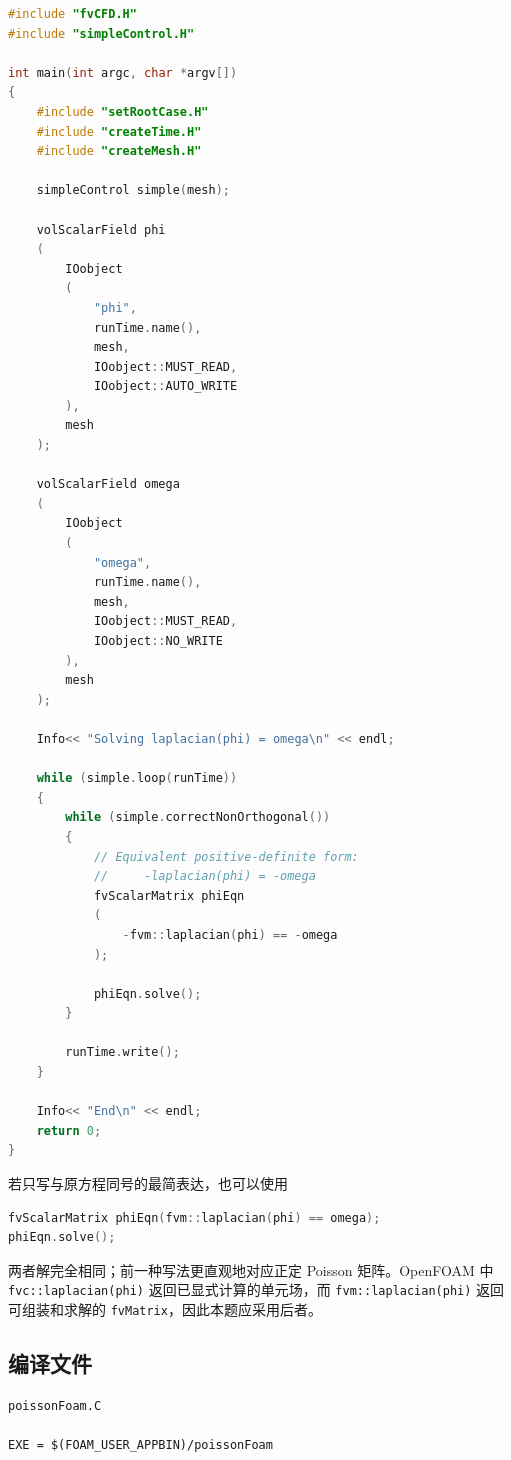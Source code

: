 \documentclass[UTF8,a4paper,11pt]{ctexart}
\begin{document}
\begin{lstlisting}[language=C++,caption={poissonFoam.C}]
#include "fvCFD.H"
#include "simpleControl.H"

int main(int argc, char *argv[])
{
    #include "setRootCase.H"
    #include "createTime.H"
    #include "createMesh.H"

    simpleControl simple(mesh);

    volScalarField phi
    (
        IOobject
        (
            "phi",
            runTime.name(),
            mesh,
            IOobject::MUST_READ,
            IOobject::AUTO_WRITE
        ),
        mesh
    );

    volScalarField omega
    (
        IOobject
        (
            "omega",
            runTime.name(),
            mesh,
            IOobject::MUST_READ,
            IOobject::NO_WRITE
        ),
        mesh
    );

    Info<< "Solving laplacian(phi) = omega\n" << endl;

    while (simple.loop(runTime))
    {
        while (simple.correctNonOrthogonal())
        {
            // Equivalent positive-definite form:
            //     -laplacian(phi) = -omega
            fvScalarMatrix phiEqn
            (
                -fvm::laplacian(phi) == -omega
            );

            phiEqn.solve();
        }

        runTime.write();
    }

    Info<< "End\n" << endl;
    return 0;
}
\end{lstlisting}

若只写与原方程同号的最简表达，也可以使用
\begin{lstlisting}[language=C++]
fvScalarMatrix phiEqn(fvm::laplacian(phi) == omega);
phiEqn.solve();
\end{lstlisting}
两者解完全相同；前一种写法更直观地对应正定 Poisson 矩阵。OpenFOAM 中
\texttt{fvc::\allowbreak laplacian(phi)} 返回已显式计算的单元场，而
\texttt{fvm::\allowbreak laplacian(phi)} 返回可组装和求解的
\texttt{fvMatrix}，因此本题应采用后者\cite[第 8.10.2 节]{Moukalled2016}。

\subsection{编译文件}

\begin{lstlisting}[language=OpenFOAM,caption={Make/files}]
poissonFoam.C

EXE = $(FOAM_USER_APPBIN)/poissonFoam
\end{lstlisting}
\end{document}
